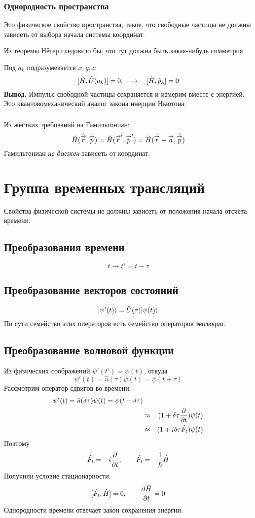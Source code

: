 \subsubsection{Однородность пространства}
Это физическое свойство пространства, такое, что свободные частицы не должны зависеть от выбора начала системы координат. 

Из теоремы Нётер следовало бы, что тут должна быть какая-нибудь симметрия.

Под $a_k$ подразумевается $x, y, z$:
$$
    [\Hat H, \Hat U(a_k)] = 0, \quad \to \quad [\Hat H, \Hat p_k] = 0
$$
\textbf{Вывод.} Импульс свободной частицы сохраняется и измерим вместе с энергией. Это квантовомеханический аналог закона инерции Ньютона.

\subsubsection{}
Из жёстких требований на Гамильтониан:
$$
    \Hat H(\Hat{\vec r}, \Hat{\vec p}) = \Hat H(\vec r', \vec p') = \Hat H(\Hat{\vec r} - \vec a, \Hat{\vec p})
$$
Гамильтониан \emph{не должен} зависеть от координат.

\section{Группа временных трансляций}
Свойства физической системы не должны зависеть от положения начала отсчёта времени.
\subsection{Преобразования времени}
$$
    t \to t' = t - \tau
$$
\subsection{Преобразование векторов состояний}
$$
    \qu{\psi'(t)} = \Hat U(\tau) \qu{\psi(t)}
$$
По сути семейство этих операторов есть семейство операторов \emph{эволюции}.
\subsection{Преобразование волновой функции}
Из физических соображений $\psi'(t') = \psi(t)$, откуда
$$
    \psi'(t) = \hat u (\tau) \psi(t) = \psi(t + \tau)
$$
Рассмотрим оператор {\infzh} сдвигов во времени.
\begin{eqnarray*}
    \psi'(t) = \hat u(\dta \tau) \psi(t) = \psi(t + \dta \tau)\\
    &\approx& (1 + \dta \tau \ud{}{t} ) \psi(t)\\
    &\approx& (1 + i \dta \tau \Hat F_t) \psi(t)
\end{eqnarray*}
Поэтому
$$
    \Hat F_t = -i \ud{}{t}, \qquad \Hat F_t = -\dfrac{1}{\hbar} \hat H
$$
Получили условие стационарности:
$$
    [\Hat F_t, \Hat H] = 0, \qquad \ud{\Hat H}{t} = 0
$$
Однородности времени отвечает закон сохранения энергии.

